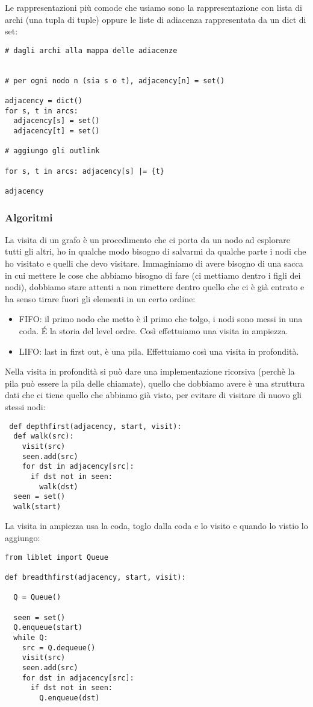 Le rappresentazioni più comode che usiamo sono la rappresentazione con lista di archi (una tupla di tuple) oppure le liste di adiacenza rappresentata da un dict di set:
\begin{lstlisting}
# dagli archi alla mappa delle adiacenze


# per ogni nodo n (sia s o t), adjacency[n] = set()

adjacency = dict()
for s, t in arcs:
  adjacency[s] = set()
  adjacency[t] = set()

# aggiungo gli outlink

for s, t in arcs: adjacency[s] |= {t}

adjacency
\end{lstlisting}

\subsubsection{Algoritmi}
La visita di un grafo è un procedimento che ci porta da un nodo ad esplorare tutti gli altri, ho in qualche modo bisogno di salvarmi da qualche parte i nodi che ho visitato e quelli che devo visitare. Immaginiamo di avere bisogno di una sacca in cui mettere le cose che abbiamo bisogno di fare (ci mettiamo dentro i figli dei nodi), dobbiamo stare attenti a non rimettere dentro quello che ci è già entrato e ha senso tirare fuori gli elementi in un certo ordine:
\begin{itemize}
    \item FIFO: il primo nodo che metto è il primo che tolgo, i nodi sono messi in una coda. \'E la storia del level ordre. Così effettuiamo una visita in ampiezza.
    \item LIFO: last in first out, è una pila. Effettuiamo così una visita in profondità.
\end{itemize}

Nella visita in profondità si può dare una implementazione ricorsiva (perchè la pila può essere la pila delle chiamate), quello che dobbiamo avere è una struttura dati che ci tiene quello che abbiamo già visto, per evitare di visitare di nuovo gli stessi nodi:
\begin{lstlisting}
 def depthfirst(adjacency, start, visit):
  def walk(src):
    visit(src)
    seen.add(src)
    for dst in adjacency[src]:
      if dst not in seen: 
        walk(dst)
  seen = set()
  walk(start)
\end{lstlisting}

La visita in ampiezza usa la coda, toglo dalla coda e lo visito e quando lo vistio lo aggiungo:
\begin{lstlisting}
from liblet import Queue

def breadthfirst(adjacency, start, visit):

  Q = Queue()

  seen = set()
  Q.enqueue(start)
  while Q:
    src = Q.dequeue()
    visit(src)
    seen.add(src)
    for dst in adjacency[src]:
      if dst not in seen:
        Q.enqueue(dst)
\end{lstlisting}

